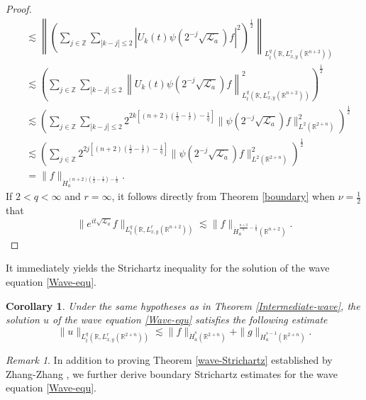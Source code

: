 \documentclass[a4paper,11pt, reqno]{amsart}
\numberwithin{equation}{section}
\theoremstyle{plain}
\newtheorem{corollary}[theorem]{Corollary}
\theoremstyle{definition}
\theoremstyle{remark}
\newtheorem{remark}[theorem]{Remark}
\begin{document}
\begin{proof}
\begin{align*}
&\lesssim \left\|\left(\sum_{j\in\mathbb{Z}}\sum_{|k-j|\leq 2}|U_k(t)\psi(2^{-j}\sqrt{\mathcal{L}_a})f|^2\right)^\frac{1}{2}\right\|_{L_t^q(\mathbb{R},L^r_{x,y}(\mathbb{R}^{n+2}))}\\
&\lesssim \left(\sum_{j\in\mathbb{Z}}\sum_{|k-j|\leq 2}\left\|U_k(t)\psi(2^{-j}\sqrt{\mathcal{L}_a})f\right\|_{L_t^q(\mathbb{R},L^r_{x,y}(\mathbb{R}^{n+2}))}^2\right)^\frac{1}{2}\\
&\lesssim \left(\sum_{j\in\mathbb{Z}}\sum_{|k-j|\leq 2}2^{2k[(n+2)(\frac{1}{2}-\frac{1}{r})-\frac{1}{q}]}\|\psi(2^{-j}\sqrt{\mathcal{L}_a})f\|^2_{L^2(\mathbb{R}^{2+n})}\right)^\frac{1}{2}\\
&\lesssim \left(\sum_{j\in\mathbb{Z}}2^{2j[(n+2)(\frac{1}{2}-\frac{1}{r})-\frac{1}{q}]}\|\psi(2^{-j}\sqrt{\mathcal{L}_a})f\|^2_{L^2(\mathbb{R}^{2+n})}\right)^\frac{1}{2}\\
&=\|f\|_{\dot{H}_a^{(n+2)(\frac{1}{2}-\frac{1}{r})-\frac{1}{q}}}.
\end{align*}
If $2<q<\infty$ and $r=\infty$, it follows directly from Theorem \ref{boundary} when $\nu=\frac{1}{2}$ that
\begin{equation*}
\|e^{it\sqrt{\mathcal{L}_a}}f\|_{L_t^q(\mathbb{R},L^r_{x,y}(\mathbb{R}^{n+2}))}\lesssim \|f\|_{\dot{H}^{\frac{n+2}{2}-\frac{1}{q}}_a(\mathbb{R}^{n+2})}.
\end{equation*}
\end{proof}
It immediately yields the Strichartz inequality for the solution of the wave equation \eqref{Wave-equ}. 
\begin{corollary}
Under the same hypotheses as in Theorem \ref{Intermediate-wave}, the solution $u$ of  the wave equation \eqref{Wave-equ} satisfies the following estimate
	\begin{equation*}
	\|u\|_{L_t^q(\mathbb{R},L^r_{x,y}(\mathbb{R}^{2+n}))}\lesssim \|f\|_{\dot{H}^s_a(\mathbb{R}^{2+n})}+\|g\|_{\dot{H}^{s-1}_a(\mathbb{R}^{2+n})}.
	\end{equation*}
\end{corollary}
\begin{remark} In addition to proving Theorem \ref{wave-Strichartz} established by Zhang-Zhang \cite{Zhang-Zhang}, we further derive boundary Strichartz estimates for the wave equation \eqref{Wave-equ}.
\end{remark} 
\end{document}
